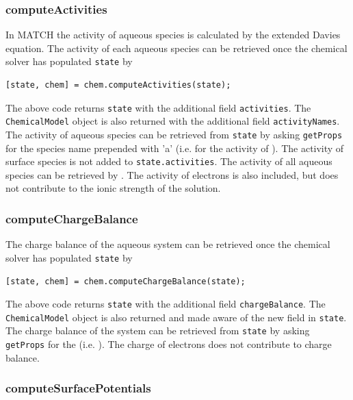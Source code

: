 \documentclass{article}
\begin{document}
\subsubsection{computeActivities}

In MATCH the activity of aqueous species is calculated by the extended Davies equation. The activity of each aqueous species can be retrieved once the chemical solver has populated \verb|state| by

\begin{lstlisting}
[state, chem] = chem.computeActivities(state);
\end{lstlisting}
The above code returns \verb|state| with the additional field \verb|activities|. The \verb|ChemicalModel| object is also returned with the additional field \verb|activityNames|. The activity of aqueous species can be retrieved from \verb|state| by asking \verb|getProps| for the species name prepended with 'a' (i.e.  for the activity of ). The activity of surface species is not added to \verb|state.activities|. The activity of all aqueous species can be retrieved by . The activity of electrons  is also included, but  does not contribute to the ionic strength of the solution.

\subsubsection{computeChargeBalance}

The charge balance of the aqueous system can be retrieved once the chemical solver has populated \verb|state| by

\begin{lstlisting}
[state, chem] = chem.computeChargeBalance(state);
\end{lstlisting}

The above code returns \verb|state| with the additional field \verb|chargeBalance|. The \verb|ChemicalModel| object is also returned and made aware of the new field in \verb|state|. The charge balance of the system can be retrieved from \verb|state| by asking \verb|getProps| for the  (i.e. ). The charge of electrons  does not contribute to charge balance. 

\subsubsection{computeSurfacePotentials}
\end{document}
